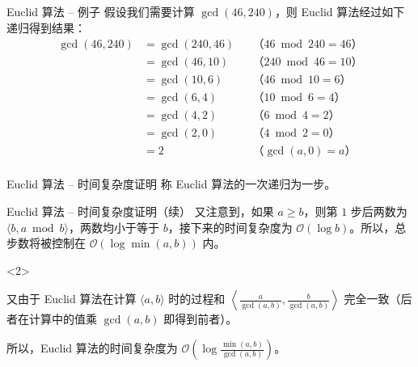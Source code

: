 \documentclass{../pkslide}
\begin{document}
\begin{frame}{Euclid 算法 -- 例子}
  假设我们需要计算 $\gcd(46, 240)$，则 Euclid 算法经过如下递归得到结果：%
  \begin{align*}
    \gcd(46, 240) &= \gcd(240, 46) & & \text{（$46 \bmod 240 = 46$）} \\
    &= \gcd(46, 10) & & \text{（$240 \bmod 46 = 10$）} \\
    &= \gcd(10, 6) & & \text{（$46 \bmod 10 = 6$）} \\
    &= \gcd(6, 4) & & \text{（$10 \bmod 6 = 4$）} \\
    &= \gcd(4, 2) & & \text{（$6 \bmod 4 = 2$）} \\
    &= \gcd(2, 0) & & \text{（$4 \bmod 2 = 0$）} \\
    &= 2 & & \text{（$\gcd(a, 0) = a$）} \\
  \end{align*}
\end{frame}

\begin{frame}{Euclid 算法 -- 时间复杂度证明}
  称 Euclid 算法的一次递归为一步。
  
  
  
\end{frame}

\begin{frame}{Euclid 算法 -- 时间复杂度证明（续）}
  又注意到，如果 $a \ge b$，则第 $1$ 步后两数为 $\langle b, a \bmod b \rangle$，两数均小于等于 $b$，接下来的时间复杂度为 $\mathcal O (\log b)$。所以，总步数将被控制在 $\mathcal O (\log \min(a, b))$ 内。
  
  \begin{visibleenv}<2>
    \emptyline
    
    又由于 Euclid 算法在计算 $\langle a, b \rangle$ 时的过程和 $\left\langle \frac{a}{\gcd(a, b)}, \frac{b}{\gcd(a, b)} \right\rangle$ 完全一致（后者在计算中的值乘 $\gcd(a, b)$ 即得到前者）。
    
    所以，Euclid 算法的时间复杂度为 $\mathcal O \!\left( \log \frac{\min(a, b)}{\gcd(a, b)} \right)$。
  \end{visibleenv}
\end{frame}
\end{document}
